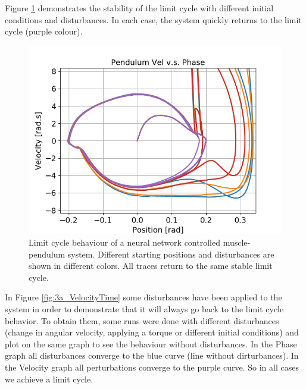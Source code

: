 \documentclass{cmc}
\begin{document}
Figure \ref{fig:3a_VelocityPhase} demonstrates the stability of the limit cycle with different initial conditions and disturbances. In each case, the system quickly returns to the limit cycle (purple colour). 

\begin{figure}[H]
      \centering
      \includegraphics[width=.65\textwidth]{3a/3a_VelocityPhase.png}
      \caption{Limit cycle behaviour of a neural network controlled muscle-pendulum system. Different starting positions and disturbances are shown in different colors. All traces return to the same stable limit cycle.}
      \label{fig:3a_VelocityPhase}
\end{figure}

In Figure \ref{fig:3a_VelocityTime} some disturbances have been applied to the system in order to demonstrate that it will always go back to the limit cycle behavior. To obtain them, some runs were done with different disturbances (change in angular velocity, applying a torque or different initial conditions) and plot on the same graph to see the behaviour without disturbances. 
In the Phase graph all disturbances converge to the blue curve (line without dirturbances). In the Velocity graph all perturbations converge to the purple curve. So in all cases we achieve a limit cycle. 
\end{document}

